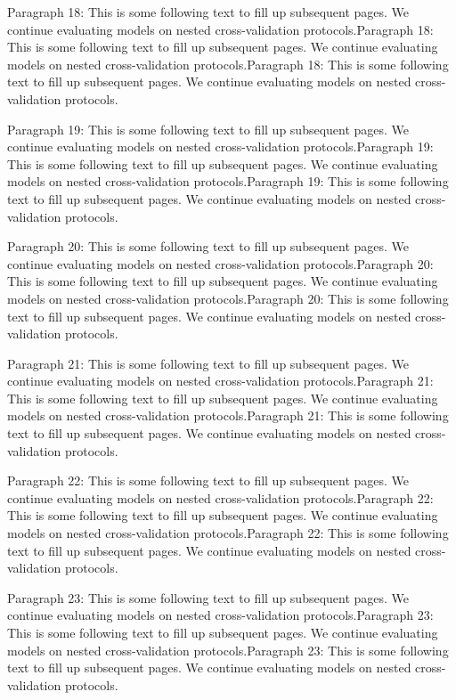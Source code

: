 \documentclass{IEEEtran}
\begin{document}
Paragraph 18: This is some following text to fill up subsequent pages. We continue evaluating models on nested cross-validation protocols.Paragraph 18: This is some following text to fill up subsequent pages. We continue evaluating models on nested cross-validation protocols.Paragraph 18: This is some following text to fill up subsequent pages. We continue evaluating models on nested cross-validation protocols.

Paragraph 19: This is some following text to fill up subsequent pages. We continue evaluating models on nested cross-validation protocols.Paragraph 19: This is some following text to fill up subsequent pages. We continue evaluating models on nested cross-validation protocols.Paragraph 19: This is some following text to fill up subsequent pages. We continue evaluating models on nested cross-validation protocols.

Paragraph 20: This is some following text to fill up subsequent pages. We continue evaluating models on nested cross-validation protocols.Paragraph 20: This is some following text to fill up subsequent pages. We continue evaluating models on nested cross-validation protocols.Paragraph 20: This is some following text to fill up subsequent pages. We continue evaluating models on nested cross-validation protocols.

Paragraph 21: This is some following text to fill up subsequent pages. We continue evaluating models on nested cross-validation protocols.Paragraph 21: This is some following text to fill up subsequent pages. We continue evaluating models on nested cross-validation protocols.Paragraph 21: This is some following text to fill up subsequent pages. We continue evaluating models on nested cross-validation protocols.

Paragraph 22: This is some following text to fill up subsequent pages. We continue evaluating models on nested cross-validation protocols.Paragraph 22: This is some following text to fill up subsequent pages. We continue evaluating models on nested cross-validation protocols.Paragraph 22: This is some following text to fill up subsequent pages. We continue evaluating models on nested cross-validation protocols.

Paragraph 23: This is some following text to fill up subsequent pages. We continue evaluating models on nested cross-validation protocols.Paragraph 23: This is some following text to fill up subsequent pages. We continue evaluating models on nested cross-validation protocols.Paragraph 23: This is some following text to fill up subsequent pages. We continue evaluating models on nested cross-validation protocols.
\end{document}
